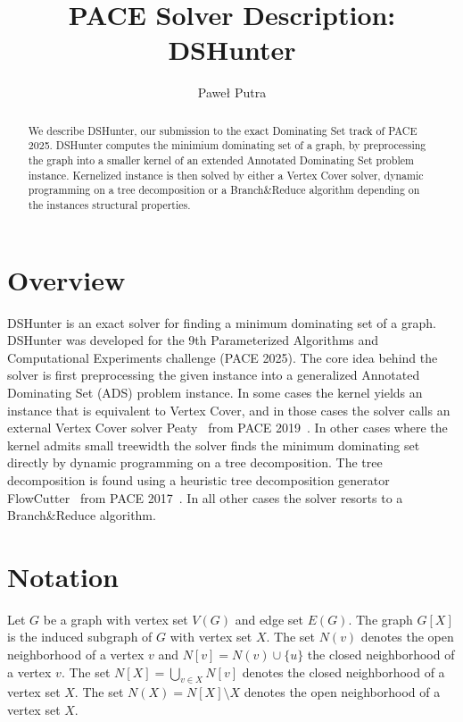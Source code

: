 \documentclass[a4paper,UKenglish,cleveref, autoref, thm-restate]{lipics-v2021}
\title{PACE Solver Description: DSHunter} %
\author{Paweł Putra}{University of Warsaw, Poland }{pawelputra0@gmail.com}{}{}%
\begin{document}
\maketitle

\begin{abstract}
We describe DSHunter, our submission to the exact Dominating Set track of PACE 2025. DSHunter computes the minimium dominating set of a graph, by preprocessing the graph
into a smaller kernel of an extended Annotated Dominating Set problem instance. 
Kernelized instance is then solved by either a Vertex Cover solver, dynamic programming on a tree decomposition or a Branch\&Reduce algorithm depending on the instances structural properties.
\end{abstract}

\section{Overview}
\label{sec:overview}

DSHunter is an exact solver for finding a minimum dominating set of a graph. DSHunter was developed for the 9th Parameterized Algorithms and Computational Experiments challenge (PACE 2025).
The core idea behind the solver is first preprocessing the given instance into a generalized Annotated Dominating Set (ADS) problem instance.
In some cases the kernel yields an instance that is equivalent to Vertex Cover, and in those cases the solver calls an external Vertex Cover solver Peaty~\cite{james_trimble_2019_3082356} from PACE 2019~\cite{DBLP:conf/iwpec/DzulfikarFH19}.
In other cases where the kernel admits small treewidth the solver finds the minimum dominating set directly by dynamic programming on a tree decomposition.
The tree decomposition is found using a heuristic tree decomposition generator  FlowCutter~\cite{DBLP:conf/alenex/HamannS16} from PACE 2017~\cite{DBLP:conf/iwpec/DellKTW17}.
In all other cases the solver resorts to a Branch\&Reduce algorithm.


\section{Notation}

Let $G$ be a graph with vertex set $V(G)$ and edge set $E(G)$. The graph $G[X]$ is the induced subgraph of $G$ with vertex set $X$.
The set $N(v)$ denotes the open neighborhood of a vertex $v$ and $N[v] = N(v) \cup \{u\}$ the closed neighborhood of a vertex $v$.
The set $N[X] = \bigcup_{v \in X} N[v]$ denotes the closed neighborhood of a vertex set $X$.
The set $N(X) = N[X] \setminus X$ denotes the open neighborhood of a vertex set $X$.
\end{document}
